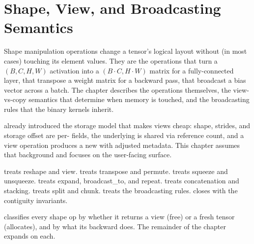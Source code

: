\chapter{Shape, View, and Broadcasting Semantics}
\label{ch:shape_view}

Shape manipulation operations change a tensor's logical layout
without (in most cases) touching its element values. They are the
operations that turn a $(B, C, H, W)$ activation into a
$(B \cdot C, H \cdot W)$ matrix for a fully-connected layer, that
transpose a weight matrix for a backward pass, that broadcast a
bias vector across a batch. The chapter describes the operations
themselves, the view-vs-copy semantics that determine when memory
is touched, and the broadcasting rules that the binary kernels
inherit.

 already introduced the storage model that
makes views cheap: shape, strides, and storage offset are
per- fields, the underlying  is
shared via reference count, and a view operation produces a new
 with adjusted metadata. This chapter assumes that
background and focuses on the user-facing surface.

 treats reshape and view.
 treats transpose and permute.
 treats squeeze and unsqueeze.
 treats expand, broadcast\_to, and
repeat.  treats concatenation and
stacking.  treats split and chunk.
 treats the broadcasting rules.
 closes with the contiguity
invariants.

 classifies every shape op by
whether it returns a view (free) or a fresh tensor (allocates),
and by what its backward does. The remainder of the chapter
expands on each.

